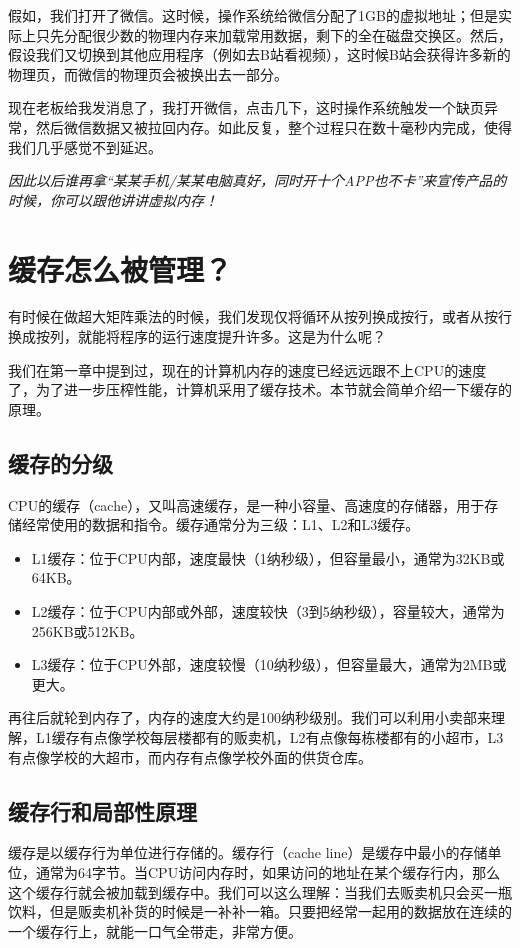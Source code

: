 \documentclass[../main.tex]{subfiles}
\begin{document}
假如，我们打开了微信。这时候，操作系统给微信分配了1GB的虚拟地址；但是实际上只先分配很少数的物理内存来加载常用数据，剩下的全在磁盘交换区。然后，假设我们又切换到其他应用程序（例如去B站看视频），这时候B站会获得许多新的物理页，而微信的物理页会被换出去一部分。

现在老板给我发消息了，我打开微信，点击几下，这时操作系统触发一个缺页异常，然后微信数据又被拉回内存。如此反复，整个过程只在数十毫秒内完成，使得我们几乎感觉不到延迟。

\emph{因此以后谁再拿“某某手机/某某电脑真好，同时开十个APP也不卡”来宣传产品的时候，你可以跟他讲讲虚拟内存！}

\section{缓存怎么被管理？}

有时候在做超大矩阵乘法的时候，我们发现仅将循环从按列换成按行，或者从按行换成按列，就能将程序的运行速度提升许多。这是为什么呢？

我们在第一章中提到过，现在的计算机内存的速度已经远远跟不上CPU的速度了，为了进一步压榨性能，计算机采用了缓存技术。本节就会简单介绍一下缓存的原理。

\subsection{缓存的分级}

CPU的缓存（cache），又叫高速缓存，是一种小容量、高速度的存储器，用于存储经常使用的数据和指令。缓存通常分为三级：L1、L2和L3缓存。
\begin{itemize}
    \item L1缓存：位于CPU内部，速度最快（1纳秒级），但容量最小，通常为32KB或64KB。
    \item L2缓存：位于CPU内部或外部，速度较快（3到5纳秒级），容量较大，通常为256KB或512KB。
    \item L3缓存：位于CPU外部，速度较慢（10纳秒级），但容量最大，通常为2MB或更大。
\end{itemize}
再往后就轮到内存了，内存的速度大约是100纳秒级别。我们可以利用小卖部来理解，L1缓存有点像学校每层楼都有的贩卖机，L2有点像每栋楼都有的小超市，L3有点像学校的大超市，而内存有点像学校外面的供货仓库。

\subsection{缓存行和局部性原理}

缓存是以缓存行为单位进行存储的。缓存行（cache line）是缓存中最小的存储单位，通常为64字节。当CPU访问内存时，如果访问的地址在某个缓存行内，那么这个缓存行就会被加载到缓存中。我们可以这么理解：当我们去贩卖机只会买一瓶饮料，但是贩卖机补货的时候是一补补一箱。只要把经常一起用的数据放在连续的一个缓存行上，就能一口气全带走，非常方便。
\end{document}
